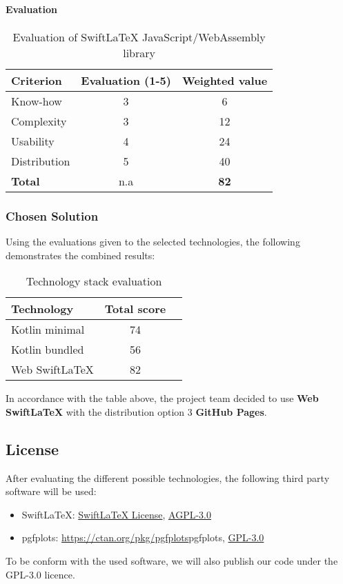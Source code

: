 \paragraph{Evaluation}\mbox{}\newline
\begin{table}[H]
    \centering
    \begin{tabular}{|l|c|c|}
        \hline
        \textbf{Criterion} & \textbf{Evaluation (1-5)} & \textbf{Weighted value} \\
        \hline
        Know-how & 3 & 6 \\
        \hline
        Complexity & 3 & 12 \\
        \hline
        Usability & 4 & 24 \\
        \hline
        Distribution & 5 & 40 \\
        \hline
        \textbf{Total} & n.a & \textbf{82} \\
        \hline
    \end{tabular}
    \caption{Evaluation of SwiftLaTeX JavaScript/WebAssembly library}
    \label{table:swiftlatex_evaluation}
\end{table}

\subsubsection{Chosen Solution}
Using the evaluations given to the selected technologies, the following demonstrates the combined results:
\begin{table}[H]
    \centering
    \begin{tabular}{|l|c|c|}
        \hline
        \textbf{Technology} & \textbf{Total score} \\
        \hline
        Kotlin minimal & 74 \\
        \hline
        Kotlin bundled & 56 \\
        \hline
        Web SwiftLaTeX & 82 \\
        \hline
    \end{tabular}
    \caption{Technology stack evaluation}
    \label{table:technology_evaluation}
\end{table}
In accordance with the table above, the project team decided to use \textbf{Web SwiftLaTeX} with the distribution option 3 \textbf{GitHub Pages}.

\subsection{License}
After evaluating the different possible technologies, the following third party software will be used:
\begin{itemize}
    \item SwiftLaTeX: \href{https://github.com/SwiftLaTeX/SwiftLaTeX/blob/master/LICENSE}{SwiftLaTeX License}, \href{https://www.gnu.org/licenses/agpl-3.0.en.html}{AGPL-3.0}
    \item pgfplots: \href{https://ctan.org/pkg/pgfplots}{https://ctan.org/pkg/pgfplots}{pgfplots}, \href{https://www.gnu.org/licenses/gpl-3.0.en.html}{GPL-3.0}
\end{itemize}
To be conform with the used software, we will also publish our code under the GPL-3.0 licence.